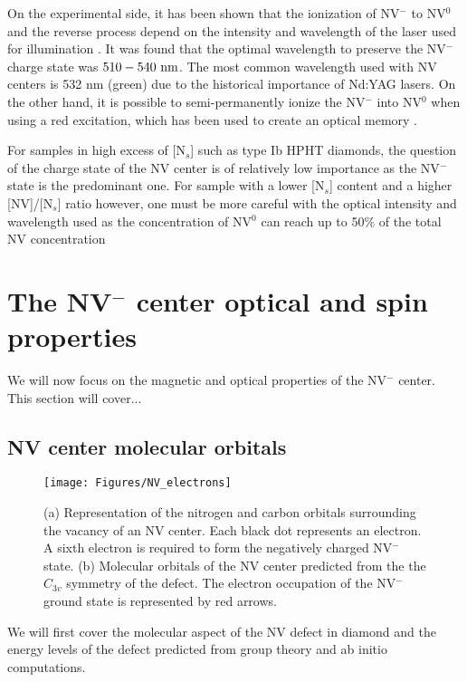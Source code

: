 \documentclass[a4paper,11pt]{report}
\begin{document}
On the experimental side, it has been shown that the ionization of NV$^-$ to NV$^0$ and the reverse process depend on the intensity and wavelength of the laser used for illumination \citep{aslam2013photo}. It was found that the optimal wavelength to preserve the NV$^-$ charge state was  $510-540\ \rm nm$. The most common wavelength used with NV centers is 532 nm (green) due to the historical importance of Nd:YAG lasers. On the other hand, it is possible to semi-permanently ionize the NV$^-$ into NV$^0$ when using a red excitation, which has been used to create an optical memory \citep{dhomkar2016long}.

For samples in high excess of [N$_s$] such as type Ib HPHT diamonds, the question of the charge state of the NV center is of relatively low importance as the NV$^-$ state is the predominant one. For sample with a lower [N$_s$] content and a higher [NV]/[N$_s$] ratio however, one must be more careful with the optical intensity and wavelength used as the concentration of NV$^0$ can reach up to 50\% of the total NV concentration \citep{grezes2015storage}

\section{The NV$^-$ center optical and spin properties}

We will now focus on the magnetic and optical properties of the NV$^-$ center. This section will cover...

\subsection{NV center molecular orbitals}

\begin{figure}[h!]
\centering
\texttt{[image: Figures/NV\_electrons]}
\caption{(a) Representation of the nitrogen and carbon orbitals surrounding the vacancy of an NV center. Each black dot represents an electron. A sixth electron is required to form the negatively charged NV$^-$ state. (b) Molecular orbitals of the NV center predicted from the the $C_{3v}$ symmetry of the defect. The electron occupation of the NV$^-$ ground state is represented by red arrows.}
\label{NV electrons}
\end{figure}

We will first cover the molecular aspect of the NV defect in diamond and the energy levels of the defect predicted from group theory and ab initio computations.
\end{document}

